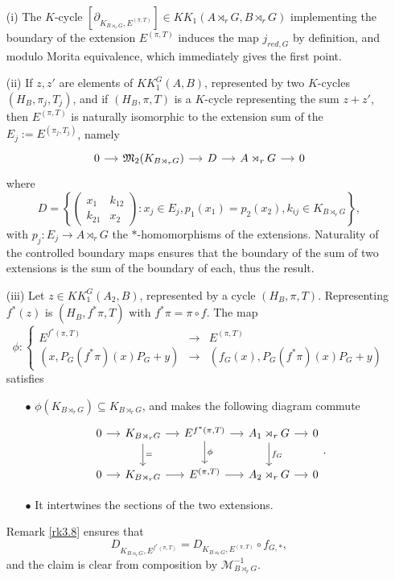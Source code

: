 \begin{dem}
\begin{enumerate}

\item[(i)]The $K$-cycle $[\partial_{K_{B\rtimes_r G},E^{(\pi,T)}}]\in KK_1(A\rtimes_r G, B\rtimes_r G)$ implementing the boundary of the extension $E^{(\pi,T)}$ induces the map $j_{red,G}$ by definition, and modulo Morita equivalence, which immediately gives the first point.

\item[(ii)] If $z,z'$ are elements of $KK_1^G(A,B)$, represented by two $K$-cycles $(H_B,\pi_j,T_j)$, and if $(H_B,\pi,T)$ is a $K$-cycle representing the sum $z+z'$, then $E^{(\pi,T)}$ is naturally isomorphic to the extension sum of the $E_j:=E^{(\pi_j,T_j)}$, namely
\[\begin{tikzcd}[column sep = small]
0\arrow{r} & \mathfrak M_2(K_{B\rtimes_r G}) \arrow{r} & D \arrow{r} & A\rtimes_r G \arrow{r} & 0
\end{tikzcd}\]
where 
\[D=\left\{\begin{pmatrix}x_1 & k_{12}\\ k_{21} & x_2\end{pmatrix} : x_j\in E_j , p_1(x_1)=p_2(x_2), k_{ij}\in K_{B\rtimes_r G}\right\},\]
with $p_j : E_j\rightarrow A\rtimes_r G$ the $*$-homomorphisms of the extensions.
Naturality of the controlled boundary maps \cite{OY2} ensures that the boundary of the sum of two extensions is the sum of the boundary of each, thus the result.
\item[(iii)] Let $z\in KK_1^G(A_2,B)$, represented by a cycle $(H_B,\pi,T)$. Representing $f^*(z)$ is $(H_B,f^*\pi,T)$ with $f^*\pi=\pi \circ f$. The map 
\[\phi : \left\{\begin{array}{lll} E^{f^*(\pi,T)} & \rightarrow & E^{(\pi,T)} \\
( x, P_G(f^*\pi)(x)P_G+y) & \rightarrow & ( f_G(x), P_G(f^*\pi)(x)P_G+y) \end{array}\right. \]
satisfies
\begin{enumerate}
\item[$\bullet$] $\phi(K_{B\rtimes_r G})\subseteq K_{B\rtimes_r G}$, and makes the following diagram commute
\[\begin{tikzcd}[column sep = small]
0\arrow{r} & K_{B\rtimes_r G}\arrow{r}\arrow{d}{=} & E^{f^*(\pi,T)} \arrow{r}\arrow{d}{\phi}& A_1\rtimes_r G\arrow{r}\arrow{d}{f_G} & 0\\
0\arrow{r} & K_{B\rtimes_r G}\arrow{r} & E^{(\pi,T)} \arrow{r}& A_2\rtimes_r G\arrow{r} & 0
\end{tikzcd}.\]
\item[$\bullet$] It intertwines the sections of the two extensions.
\end{enumerate}
Remark \ref{rk3.8} ensures that \[D_{K_{B\rtimes_r G}, E^{f^*(\pi,T)} } =  D_{K_{B\rtimes_r G}, E^{(\pi,T)} }\circ f_{G,*},\] and the claim is clear from composition by $\mathcal M_{B\rtimes_r G}^{-1}$.


\end{enumerate}
\end{dem}
